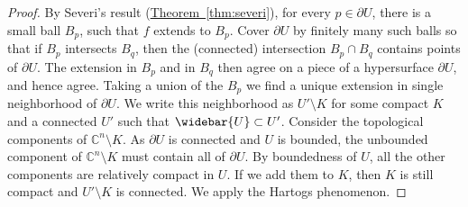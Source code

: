 \documentclass[12pt,openany]{book}
\newcommand{\C}{{\mathbb{C}}}
\theoremstyle{plain}
\theoremstyle{remark}
\theoremstyle{definition}
\theoremstyle{exercise}
\theoremstyle{example}
\newcommand{\thmref}[1]{\hyperref[#1]{Theorem~\ref*{#1}}}
\begin{document}
\begin{proof}
By Severi's result (\thmref{thm:severi}), for every $p \in \partial U$,
there is a small ball $B_p$, such that $f$ extends to $B_p$.  Cover $\partial
U$ by finitely many such balls so that if $B_p$ intersects $B_q$, then 
the (connected) intersection $B_p \cap B_q$ contains points of $\partial U$.
The extension in $B_p$ and in $B_q$ then agree on a piece of a hypersurface
$\partial U$, and hence agree.  Taking a union of the $B_p$ we find
a unique extension in single neighborhood of $\partial U$.
We write this neighborhood as $U' \setminus K$ for some compact $K$
and a connected $U'$ such that $\widebar{U} \subset U'$.
Consider the topological components of $\C^n \setminus K$.  As
$\partial U$ is connected and $U$ is bounded,
the unbounded component of $\C^n \setminus K$ must contain all of $\partial U$.
By boundedness of $U$, all the other components are
relatively compact in $U$.  If we add them to $K$, then $K$
is still compact and $U' \setminus K$ is connected.
We apply the Hartogs phenomenon.
\end{proof}
\end{document}
